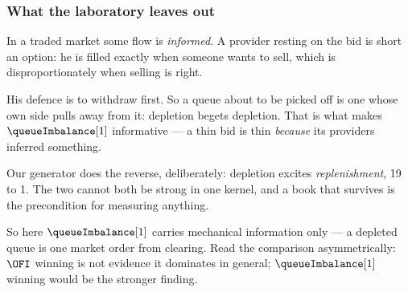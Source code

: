 \begin{frame}
  \frametitle{What the laboratory leaves out}
In a traded market some flow is \emph{informed}.
A provider resting on the bid is short an option:
he is filled exactly when someone wants to sell, which is disproportionately when selling
is right.

\pause

His defence is to withdraw first.
So a queue about to be picked off is one whose own side pulls away from it:
\alert{depletion begets depletion}.
That is what makes $\queueImbalance[1]$ informative --- a thin bid is thin \emph{because}
its providers inferred something.

\pause

Our generator does the reverse, deliberately: depletion excites \emph{replenishment},
19 to 1.
The two cannot both be strong in one kernel, and a book that survives is the precondition
for measuring anything.

\pause

So here $\queueImbalance[1]$ carries \alert{mechanical} information only ---
a depleted queue is one market order from clearing.
Read the comparison asymmetrically:
$\OFI$ winning is not evidence it dominates in general;
$\queueImbalance[1]$ winning would be the stronger finding.
\end{frame}

